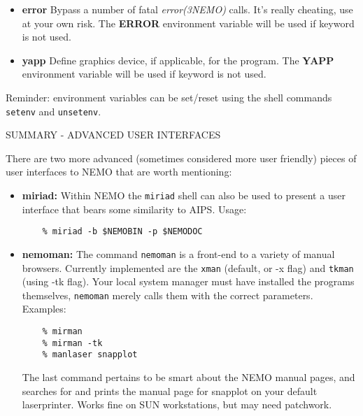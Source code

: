 \begin{itemize}
\item{\bf error} Bypass a number of fatal {\it error(3NEMO)} calls. It's really
cheating, use at your own risk. The {\bf ERROR}
environment variable will be used if keyword is not used.

\item {\bf yapp} Define graphics device, if applicable, for the program.
The  {\bf YAPP} environment variable will be used if keyword is not used.

\end{itemize}

Reminder: environment variables can be set/reset using the shell commands
{\tt setenv} and {\tt unsetenv}.

\newpage
\centerline{SUMMARY - ADVANCED USER INTERFACES}

There are two more advanced (sometimes considered more user friendly)
pieces of user interfaces to NEMO that are worth mentioning:

\begin{itemize}

\item {\bf miriad:} Within NEMO the {\tt miriad} shell can also be
used to present a user interface that 
bears some similarity to AIPS. Usage:

\begin{verbatim}
	% miriad -b $NEMOBIN -p $NEMODOC
\end{verbatim}


\item {\bf nemoman:} The command {\tt nemoman} is a front-end
to a variety of manual browsers. Currently implemented are 
the {\tt xman} (default, or -x flag) 
and {\tt tkman} (using -tk flag). Your local system manager must
have installed the programs themselves, {\tt nemoman} merely calls
them with the correct parameters. Examples:

\begin{verbatim}
	% mirman
	% mirman -tk
	% manlaser snapplot
\end{verbatim}

The last command pertains to be smart about the NEMO manual pages, and
searches for and prints the manual page for snapplot on your default
laserprinter. Works fine on SUN workstations, but may need patchwork.


\end{itemize}



